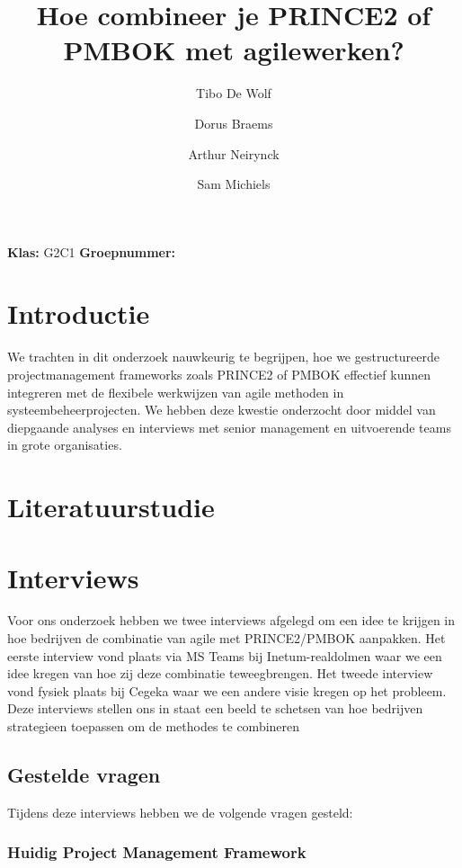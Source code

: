 \documentclass[dutch]{hogent-article}
\title{Hoe combineer je PRINCE2 of PMBOK met agile\linebreak werken?}
\author{Tibo De Wolf}
\author{Dorus Braems}
\author{Arthur Neirynck}
\author{Sam Michiels}
\begin{document}
\begin{abstract}

\end{abstract}
\bigskip
\textbf{Klas:} G2C1
\newline
\textbf{Groepnummer:} 


\newpage

\tableofcontents
\pagebreak

\section{Introductie}%
\label{sec:introductie}
We trachten in dit onderzoek nauwkeurig te begrijpen, hoe we gestructureerde projectmanagement frameworks zoals PRINCE2 of PMBOK effectief kunnen integreren met de flexibele werkwijzen van agile methoden in systeembeheerprojecten. We hebben deze kwestie onderzocht door middel van diepgaande analyses en interviews met senior management en uitvoerende teams in grote \linebreak organisaties.

\section{Literatuurstudie}%
\label{sec:literatuurstudie}


\section{Interviews}
\label{sec:interviews}
Voor ons onderzoek hebben we twee interviews afgelegd om een idee te krijgen
in hoe bedrijven de combinatie van agile met PRINCE2/PMBOK aanpakken.
Het eerste interview vond plaats via MS Teams bij Inetum-realdolmen
waar we een idee kregen van hoe zij deze combinatie teweegbrengen. Het tweede interview vond fysiek plaats
bij Cegeka waar we een andere visie kregen op het probleem. Deze interviews stellen ons in staat een beeld te schetsen van hoe bedrijven strategieen toepassen om de methodes te combineren

\subsection{Gestelde vragen}%
\label{ssec:gestelde-vragen}

Tijdens deze interviews hebben we de volgende vragen gesteld:

\subsubsection{Huidig Project Management Framework}
\label{ssec:Huidig Project Management Framework}
\end{document}
